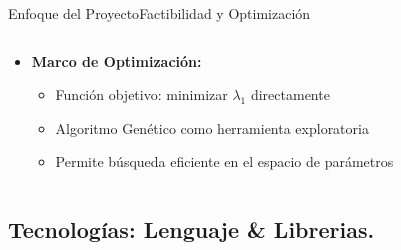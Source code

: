 \begin{frame}{Enfoque del Proyecto}{Factibilidad y Optimización}
\begin{columns}
\begin{column}{0.6\textwidth}
\begin{itemize}
\begin{itemize}
                \end{itemize}
                \item \textbf{Marco de Optimización:} %
                \begin{itemize}
                    \item Función objetivo: minimizar $\lambda_1$ directamente
                    \item Algoritmo Genético como herramienta exploratoria
                    \item Permite búsqueda eficiente en el espacio de parámetros
                \end{itemize}
            \end{itemize}
        \end{column}
    \end{columns}
\end{frame}

\subsection[Tecnologías]{Tecnologías: Lenguaje \& Librerias.}

